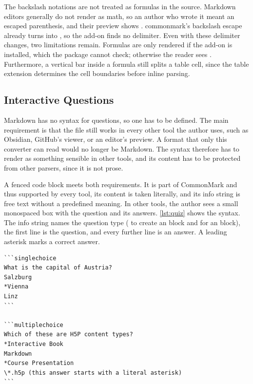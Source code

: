 The backslash notations are not treated as formulas in the source.
Markdown editors generally do not render  as math, so an author who wrote it
meant an escaped parenthesis, and their preview shows .
commonmark's backslash escape already turns \code{\textbackslash(} into \code{(}, so the add-on finds
no delimiter.
Even with these delimiter changes, two limitations remain.
Formulas are only rendered if the add-on is installed, which the package cannot check; otherwise the
reader sees .
Furthermore, a vertical bar inside a formula still splits a table cell, since the table extension
determines the cell boundaries before inline parsing.

\subsection{Interactive Questions}
\label{sec:ex_quiz}

Markdown has no syntax for questions, so one has to be defined.
The main requirement is that the file still works in every other tool the author uses, such
as Obsidian, GitHub's viewer, or an editor's preview.
A format that only this converter can read would no longer be Markdown.
The syntax therefore has to render as something sensible in other tools, and its content has to be
protected from other parsers, since it is not prose.

A fenced code block meets both requirements.
It is part of CommonMark and thus supported by every tool, its content is taken literally, and its
info string is free text without a predefined meaning.
In other tools, the author sees a small monospaced box with the question and its answers.
\autoref{lst:quiz} shows the syntax.
The info string names the question type ( to create an  block and  for an  block), the first line is the question, and every further line is an
answer.
A leading asterisk marks a correct answer.

\par\medskip
\noindent\begin{minipage}{\linewidth}
\begin{lstlisting}[morecomment={[l][\color{blue!60!black}]{```}},caption={[Example questions as fenced code blocks]A single-choice and a multiple-choice question as fenced code blocks.
The info string selects the type, the first line is the question, and a leading asterisk marks a
correct answer.},label={lst:quiz}]
```singlechoice
What is the capital of Austria?
Salzburg
*Vienna
Linz
```

```multiplechoice
Which of these are H5P content types?
*Interactive Book
Markdown
*Course Presentation
\*.h5p (this answer starts with a literal asterisk)
```
\end{lstlisting}
\end{minipage}

